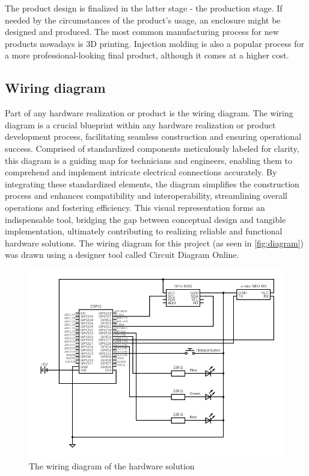\documentclass[FM,BP,EN,fonts]{tulthesis}
\begin{document}
The product design is finalized in the latter stage - the production stage. If needed by the circumstances of the product's usage, an enclosure might be designed and produced. The most common manufacturing process for new products nowadays is 3D printing. Injection molding is also a popular process for a more professional-looking final product, although it comes at a higher cost.

\subsection{Wiring diagram}
Part of any hardware realization or product is the wiring diagram. The wiring diagram is a crucial blueprint within any hardware realization or product development process, facilitating seamless construction and ensuring operational success. Comprised of standardized components meticulously labeled for clarity, this diagram is a guiding map for technicians and engineers, enabling them to comprehend and implement intricate electrical connections accurately. By integrating these standardized elements, the diagram simplifies the construction process and enhances compatibility and interoperability, streamlining overall operations and fostering efficiency. This visual representation forms an indispensable tool, bridging the gap between conceptual design and tangible implementation, ultimately contributing to realizing reliable and functional hardware solutions. The wiring diagram for this project (as seen in \autoref{fig:diagram}) was drawn using a designer tool called Circuit Diagram Online.

\begin{figure}[p]
    \centering
    \includegraphics[scale=.6]{media/circuit.png}
    \caption{The wiring diagram of the hardware solution}
    \label{fig:diagram}
\end{figure}
\end{document}
